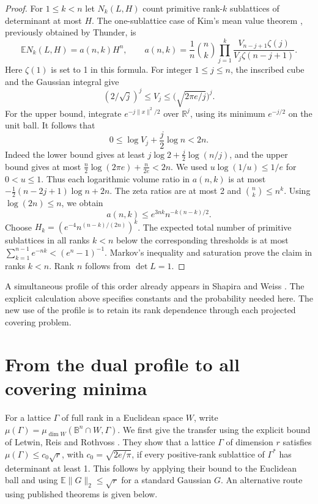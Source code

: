 \documentclass[11pt]{article}
\newcommand{\B}{\mathbb B}
\newcommand{\R}{\mathbb R}
\begin{document}
\begin{proof}
For \(1\le k<n\) let \(N_k(L,H)\) count primitive rank-\(k\)
sublattices of determinant at most \(H\).
The one-sublattice case of Kim's mean value theorem
\cite[Thm.~3]{Kim}, previously obtained by Thunder, is
\[
 {\mathbb E}N_k(L,H)=a(n,k)H^n,\qquad
 a(n,k)=\frac1n\binom nk\prod_{j=1}^k
       \frac{V_{n-j+1}\zeta(j)}{V_j\zeta(n-j+1)}.
\]
Here \(\zeta(1)\) is set to 1 in this formula.
For integer \(1\le j\le n\), the inscribed cube and the Gaussian
integral give
\[
 (2/\sqrt j)^j\le V_j\le \bigl(\sqrt{2\pi e/j}\bigr)^j .
\]
For the upper bound, integrate \(e^{-j\|x\|^2/2}\) over
\(\R^j\), using its minimum \(e^{-j/2}\) on the unit ball.
It follows that
\[
 0\le\log V_j+\frac j2\log n<2n .
\]
Indeed the lower bound gives at least
\(j\log2+\tfrac j2\log(n/j)\), and the upper bound gives at most
\(\tfrac n2\log(2\pi e)+\tfrac n{2e}<2n\).
We used \(u\log(1/u)\le1/e\) for \(0<u\le1\).
Thus each logarithmic volume ratio in \(a(n,k)\) is at most
\(-\tfrac12(n-2j+1)\log n+2n\).
The zeta ratios are at most 2 and \(\binom nk\le n^k\).
Using \(\log(2n)\le n\), we obtain
\[
 a(n,k)\le e^{3nk}n^{-k(n-k)/2}.
\]
Choose \(H_k=(e^{-4}n^{(n-k)/(2n)})^k\).
The expected total number of primitive sublattices in all ranks
\(k<n\) below the corresponding thresholds is at most
\(\sum_{k=1}^{n-1}e^{-nk}<(e^n-1)^{-1}\).
Markov's inequality and saturation prove the claim
in ranks \(k<n\). Rank \(n\) follows from \(\det L=1\).
\end{proof}

A simultaneous profile of this order already appears in
Shapira and Weiss \cite[Prop.~3]{ShapiraWeiss}. The explicit calculation
above specifies constants and the probability needed here.
The new use of the profile is to retain its rank dependence through
each projected covering problem.

\section{From the dual profile to all covering minima}

For a lattice \(\Gamma\) of full rank in a Euclidean space \(W\),
write \(\mu(\Gamma)=\mu_{\dim W}(\B^n\cap W,\Gamma)\).
We first give the transfer using the explicit bound of Letwin, Reis
and Rothvoss \cite[Thm.~1.2]{LRR}. They show that a lattice
\(\Gamma\) of dimension \(r\) satisfies
\(\mu(\Gamma)\le c_0\sqrt{r}\), with \(c_0=\sqrt{2e/\pi}\),
if every positive-rank sublattice of \(\Gamma^*\) has determinant
at least 1. This follows by applying their bound to the Euclidean
ball and using \(\mathbb E\|G\|_2\le\sqrt r\) for a standard Gaussian
\(G\). An alternative route using published theorems is given below.
\end{document}
